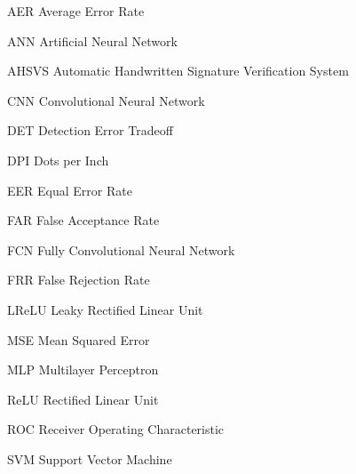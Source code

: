 \begin{siglas}

\item[AER] Average Error Rate
\item[ANN] Artificial Neural Network	
\item[AHSVS] Automatic Handwritten Signature Verification System
\item[CNN] Convolutional Neural Network
\item[DET] Detection Error Tradeoff
\item[DPI] Dots per Inch
\item[EER] Equal Error Rate
\item[FAR] False Acceptance Rate
\item[FCN] Fully Convolutional Neural Network
\item[FRR] False Rejection Rate
\item[LReLU] Leaky Rectified Linear Unit
\item[MSE] Mean Squared Error
\item[MLP] Multilayer Perceptron
\item[ReLU] Rectified Linear Unit
\item[ROC] Receiver Operating Characteristic
\item[SVM] Support Vector Machine

\end{siglas}
